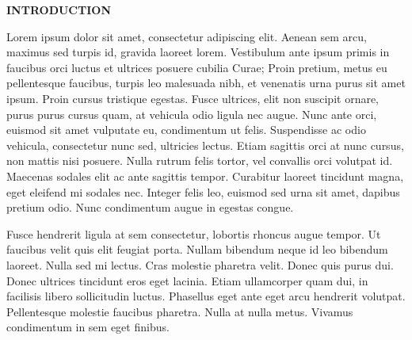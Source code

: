\centerline{\large\bf INTRODUCTION}
Lorem ipsum dolor sit amet, consectetur adipiscing elit. Aenean sem arcu, maximus sed turpis id, gravida laoreet lorem. Vestibulum ante ipsum primis in faucibus orci luctus et ultrices posuere cubilia Curae; Proin pretium, metus eu pellentesque faucibus, turpis leo malesuada nibh, et venenatis urna purus sit amet ipsum. Proin cursus tristique egestas. Fusce ultrices, elit non suscipit ornare, purus purus cursus quam, at vehicula odio ligula nec augue. Nunc ante orci, euismod sit amet vulputate eu, condimentum ut felis. Suspendisse ac odio vehicula, consectetur nunc sed, ultricies lectus. Etiam sagittis orci at nunc cursus, non mattis nisi posuere. Nulla rutrum felis tortor, vel convallis orci volutpat id. Maecenas sodales elit ac ante sagittis tempor. Curabitur laoreet tincidunt magna, eget eleifend mi sodales nec. Integer felis leo, euismod sed urna sit amet, dapibus pretium odio. Nunc condimentum augue in egestas congue.\par
Fusce hendrerit ligula at sem consectetur, lobortis rhoncus augue tempor. Ut faucibus velit quis elit feugiat porta. Nullam bibendum neque id leo bibendum laoreet. Nulla sed mi lectus. Cras molestie pharetra velit. Donec quis purus dui. Donec ultrices tincidunt eros eget lacinia. Etiam ullamcorper quam dui, in facilisis libero sollicitudin luctus. Phasellus eget ante eget arcu hendrerit volutpat. Pellentesque molestie faucibus pharetra. Nulla at nulla metus. Vivamus condimentum in sem eget finibus.\par